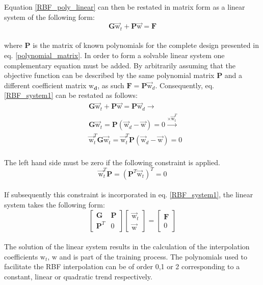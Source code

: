 Equation \ref{RBF_poly_linear} can then be 
restated in matrix form as a linear system of the 
following form:
\begin{equation}\label{RBF_system1}
\mathbf{G} \vec{\mathrm{w}}_{t} + \mathbf{P}\vec{\mathrm{w}} 
= \mathbf{F}
\end{equation}
\\[-0.3cm]
where $\mathbf{P}$ is the matrix of known polynomials for
the complete design presented in eq. 
\ref{polynomial_matrix}. In order to form a solvable 
linear system one complementary equation must be added. 
By arbitrarily assuming that the objective function can 
be described by the same polynomial matrix $\mathbf{P}$ 
and a different coefficient matrix $\bm{\mathrm{w}_{d}}$, 
as such $\mathbf{F} = \mathbf{P} \vec{\mathrm{w}}_{d}$.
Consequently, eq. \ref{RBF_system1} can be restated as 
follows:
\begin{equation}
\begin{split}
& \mathbf{G} \vec{\mathrm{w}}_{t} + \mathbf{P}
\vec{\mathrm{w}} = \mathbf{P} \vec{\mathrm{w}}_{d} 
\rightarrow
\\ &
\mathbf{G} \vec{\mathrm{w}}_{t} = \mathbf{P} \left( 
\vec{\mathrm{w}}_{d} - \vec{\mathrm{w}}  \right) = 0
\xrightarrow{\times \vec{\mathrm{w}}_{t}^{T}}
\\ &
\vec{\mathrm{w}}_{t}^{T} \mathbf{G} \vec{\mathrm{w}}_{t} =
\vec{\mathrm{w}}_{t}^{T} \mathbf{P} \left( 
\vec{\mathrm{w}}_{d} - \vec{\mathrm{w}}  \right) = 0
\end{split}
\end{equation}
\\
The left hand side must be zero if the following 
constraint is applied.
\begin{equation}
\vec{\mathrm{w}}_{t}^{T} \mathbf{P} = \left( 
\mathbf{P}^{T} \vec{\mathrm{w}}_{t} \right)^{T} = 0
\end{equation} 
\\[-0.4cm]
If subsequently this constraint is incorporated in eq. 
\ref{RBF_system1}, the linear system takes the following
form:
\begin{equation}\label{RBF_poly_linear_matrix}
\begin{bmatrix}
\mathbf{G} & \mathbf{P} \\
\mathbf{P}^{T} & 0
\end{bmatrix}
	\begin{bmatrix}
	\vec{\mathrm{w}}_{t} \\ \vec{\mathrm{w}}
	\end{bmatrix}
=
\begin{bmatrix}
\mathbf{F} \\ 0
\end{bmatrix}
\end{equation}
\\
The solution of the linear system results in the 
calculation of the interpolation coefficients 
$\mathrm{w}_{t}$, $\mathrm{w}$ and is part of the training 
process. The polynomials used to facilitate the 
RBF interpolation can be of order 0,1 or 2 corresponding 
to a constant, linear or quadratic trend respectively. 


